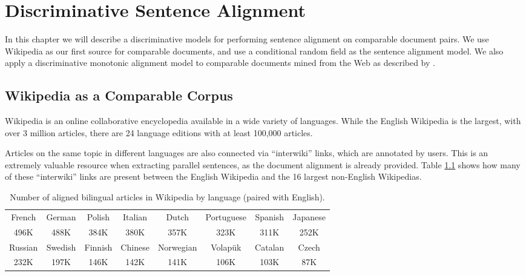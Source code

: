 \chapter{Discriminative Sentence Alignment}
\label{chap:supervised}

In this chapter we will describe a discriminative models for performing sentence
alignment on comparable document pairs. We use Wikipedia as our first source for
comparable documents, and use a conditional random field \citep{Lafferty01} as
the sentence alignment model. We also apply a discriminative monotonic alignment model to
comparable documents mined from the Web as described by \citet{Uszkoreit10}.

\section{Wikipedia as a Comparable Corpus}
\label{sec:wiki}
Wikipedia \citep{wikipedia} is an online collaborative encyclopedia available in
a wide variety of languages.  While the English Wikipedia is the largest, with
over 3 million articles, there are 24 language editions with at least 100,000
articles.

Articles on the same topic in different languages are also connected via
``interwiki'' links, which are annotated by users.  This is an extremely
valuable resource when extracting parallel sentences, as the document alignment
is already provided.  
Table \ref{table:interwiki} shows how
many of these ``interwiki'' links are present between the English Wikipedia and the
16 largest non-English Wikipedias.

\begin{table}
\small
\begin{center}
\begin{tabular}{|c|c|c|c|c|c|c|c|}
\hline
French & German & Polish & Italian & Dutch & Portuguese & Spanish & Japanese \\
496K & 488K & 384K & 380K & 357K & 323K & 311K & 252K\\
\hline
Russian & Swedish & Finnish & Chinese & Norwegian & Volap\"{u}k & Catalan & Czech \\
232K & 197K & 146K & 142K & 141K & 106K & 103K & 87K\\
\hline
\end{tabular}
\end{center}
\caption{Number of aligned bilingual articles in Wikipedia by language (paired with English).}
\label{table:interwiki}
\end{table}

